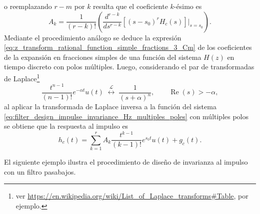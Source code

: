 \documentclass[a4paper]{report}
\renewcommand{\Re}{\operatorname{Re}}
\begin{document}
o reemplazando \(r-m\) por \(k\) resulta que el coeficiente \(k\)-ésimo es
\[
 A_{k}=\frac{1}{(r-k)!}\left(\frac{d^{r-k}}{ds^{r-k}}[(s-s_0)^rH_c(s)]\bigg|_{s=s_0}\right).
\]
Mediante el procedimiento análogo se deduce la expresión \ref{eq:z_transform_rational_function_simple_fractions_3_Cm} de los coeficientes de la expansión en fracciones simples de una función del sistema \(H(z)\) en tiempo discreto con polos múltiples. Luego, considerando el par de transformadas de Laplace\footnote{ver \url{https://en.wikipedia.org/wiki/List_of_Laplace_transforms\#Table}, por ejemplo.}
\[
 \frac{t^{n-1}}{(n-1)!}e^{-\alpha t}u(t)
 \;\overset{\mathcal{L}}{\longleftrightarrow}\;
 \frac{1}{(s+\alpha)^n},
 \qquad\Re(s)>-\alpha,
\]
al aplicar la transformada de Laplace inversa a la función del sistema \ref{eq:filter_design_impulse_invariance_Hz_multiples_poles} con múltiples polos se obtiene que la respuesta al impulso es
\[
 h_c(t)=\sum_{k=1}^rA_k\frac{t^{k-1}}{(k-1)!}e^{s_0t}u(t)+g_c(t).
\]

El siguiente ejemplo ilustra el procedimiento de diseño de invarianza al impulso con un filtro pasabajos.
\end{document}
